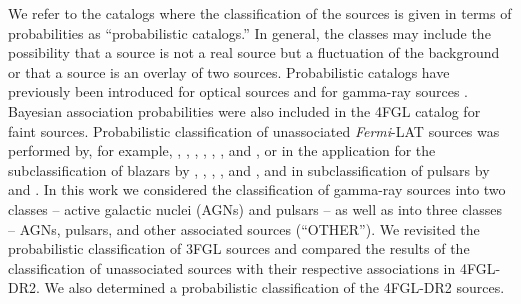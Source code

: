 \documentclass[referee]{aa} %
\newcommand{\Fermi}{\textit{Fermi}\xspace}
\begin{document}
We refer to the catalogs where the classification of the sources is given in terms of probabilities as ``probabilistic catalogs.''
In general, the classes may include the possibility that a source is not a real source but a fluctuation of the background 
\citep{2021A&A...656A..62P}
or that a source is an overlay of two sources.
Probabilistic catalogs
have previously been introduced for optical sources 
\citep[e.g.,][]{2010EAS....45..351H, 2013AJ....146....7B}
and for gamma-ray sources \citep{2017ApJ...839....4D}.
Bayesian association probabilities were also included in the 4FGL catalog \citep{2020ApJS..247...33A} for faint sources.
Probabilistic classification of unassociated \Fermi-LAT sources was performed by, for example,
\cite{2012ApJ...753...83A}, \cite{2016ApJ...820....8S}, \cite{2016ApJ...825...69M}, \cite{2017A&A...602A..86L}, \cite{2020MNRAS.492.5377L}, 
\cite{2021MNRAS.507.4061F}, and \cite{2021RAA....21...15Z},
or in the application for the subclassification of blazars by
\cite{2013MNRAS.428..220H}, \cite{2014ApJ...782...41D},
\cite{2016MNRAS.462.3180C}, \cite{2017MNRAS.470.1291S}, and \cite{2019MNRAS.490.4770K, 2020MNRAS.493.1926K},
and in subclassification of pulsars 
by \cite{2012MNRAS.424.2832L} and \cite{2016ApJ...820....8S}.
In this work we considered the classification of gamma-ray sources into two classes -- active galactic nuclei (AGNs) and pulsars -- as well as into three classes 
-- AGNs, pulsars, and other associated sources (``OTHER'').
We revisited the probabilistic classification of 3FGL sources and compared the results of the classification of unassociated sources
with their respective associations in 4FGL-DR2.
We also determined a probabilistic classification of the 4FGL-DR2 sources.
\end{document}
